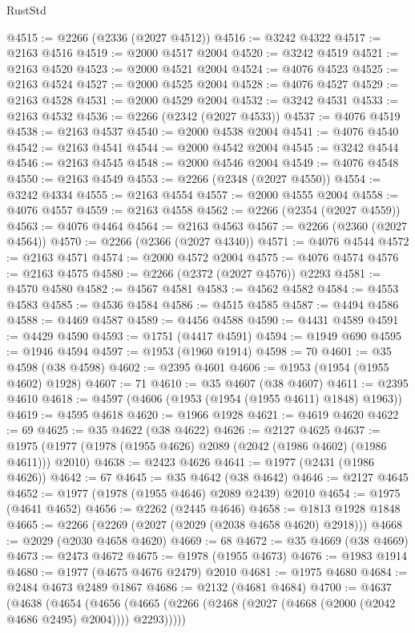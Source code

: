 \begin{lexlean}{RustStd}
\begin{coremodule}
@4515 := @2266 (@2336 (@2027 @4512))
@4516 := @3242 @4322
@4517 := @2163 @4516
@4519 := @2000 @4517 @2004
@4520 := @3242 @4519
@4521 := @2163 @4520
@4523 := @2000 @4521 @2004
@4524 := @4076 @4523
@4525 := @2163 @4524
@4527 := @2000 @4525 @2004
@4528 := @4076 @4527
@4529 := @2163 @4528
@4531 := @2000 @4529 @2004
@4532 := @3242 @4531
@4533 := @2163 @4532
@4536 := @2266 (@2342 (@2027 @4533))
@4537 := @4076 @4519
@4538 := @2163 @4537
@4540 := @2000 @4538 @2004
@4541 := @4076 @4540
@4542 := @2163 @4541
@4544 := @2000 @4542 @2004
@4545 := @3242 @4544
@4546 := @2163 @4545
@4548 := @2000 @4546 @2004
@4549 := @4076 @4548
@4550 := @2163 @4549
@4553 := @2266 (@2348 (@2027 @4550))
@4554 := @3242 @4334
@4555 := @2163 @4554
@4557 := @2000 @4555 @2004
@4558 := @4076 @4557
@4559 := @2163 @4558
@4562 := @2266 (@2354 (@2027 @4559))
@4563 := @4076 @4464
@4564 := @2163 @4563
@4567 := @2266 (@2360 (@2027 @4564))
@4570 := @2266 (@2366 (@2027 @4340))
@4571 := @4076 @4544
@4572 := @2163 @4571
@4574 := @2000 @4572 @2004
@4575 := @4076 @4574
@4576 := @2163 @4575
@4580 := @2266 (@2372 (@2027 @4576)) @2293
@4581 := @4570 @4580
@4582 := @4567 @4581
@4583 := @4562 @4582
@4584 := @4553 @4583
@4585 := @4536 @4584
@4586 := @4515 @4585
@4587 := @4494 @4586
@4588 := @4469 @4587
@4589 := @4456 @4588
@4590 := @4431 @4589
@4591 := @4429 @4590
@4593 := @1751 (@4417 @4591)
@4594 := @1949 @690
@4595 := @1946 @4594
@4597 := @1953 (@1960 @1914)
@4598 := 70
@4601 := @35 @4598 (@38 @4598)
@4602 := @2395 @4601
@4606 := @1953 (@1954 (@1955 @4602) @1928)
@4607 := 71
@4610 := @35 @4607 (@38 @4607)
@4611 := @2395 @4610
@4618 := @4597 (@4606 (@1953 (@1954 (@1955 @4611) @1848) @1963))
@4619 := @4595 @4618
@4620 := @1966 @1928
@4621 := @4619 @4620
@4622 := 69
@4625 := @35 @4622 (@38 @4622)
@4626 := @2127 @4625
@4637 := @1975 (@1977 (@1978 (@1955 @4626) @2089 (@2042 (@1986 @4602) (@1986 @4611))) @2010)
@4638 := @2423 @4626
@4641 := @1977 (@2431 (@1986 @4626))
@4642 := 67
@4645 := @35 @4642 (@38 @4642)
@4646 := @2127 @4645
@4652 := @1977 (@1978 (@1955 @4646) @2089 @2439) @2010
@4654 := @1975 (@4641 @4652)
@4656 := @2262 (@2445 @4646)
@4658 := @1813 @1928 @1848
@4665 := @2266 (@2269 (@2027 (@2029 (@2038 @4658 @4620) @2918)))
@4668 := @2029 (@2030 @4658 @4620)
@4669 := 68
@4672 := @35 @4669 (@38 @4669)
@4673 := @2473 @4672
@4675 := @1978 (@1955 @4673)
@4676 := @1983 @1914
@4680 := @1977 (@4675 @4676 @2479) @2010
@4681 := @1975 @4680
@4684 := @2484 @4673 @2489 @1867
@4686 := @2132 (@4681 @4684)
@4700 := @4637
    (@4638
      (@4654
        (@4656 (@4665 (@2266 (@2468 (@2027 (@4668 (@2000 (@2042 @4686 @2495) @2004)))) @2293)))))

\end{coremodule}
\end{lexlean}
